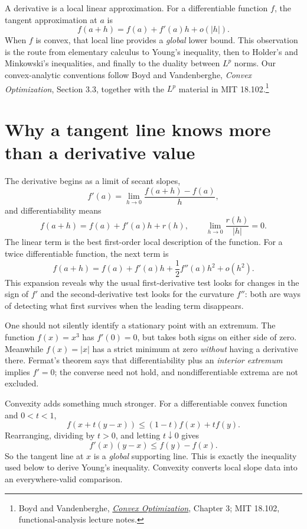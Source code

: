 
A derivative is a local linear approximation. For a differentiable function \(f\), the tangent approximation at \(a\) is
\[
 f(a+h)=f(a)+f'(a)h+o(|h|).
\]
When \(f\) is convex, that local line provides a \emph{global} lower bound. This observation is the route from elementary calculus to Young's inequality, then to Holder's and Minkowski's inequalities, and finally to the duality between \(L^p\) norms. Our convex-analytic conventions follow Boyd and Vandenberghe, \emph{Convex Optimization}, Section 3.3, together with the \(L^p\) material in MIT 18.102.\footnote{Boyd and Vandenberghe, \href{https://web.stanford.edu/~boyd/cvxbook/}{\emph{Convex Optimization}}, Chapter 3; MIT 18.102, functional-analysis lecture notes.}

\section{Why a tangent line knows more than a derivative value}

The derivative begins as a limit of secant slopes,
\[
 f'(a)=\lim_{h\to0}\frac{f(a+h)-f(a)}h,
\]
and differentiability means
\[
 f(a+h)=f(a)+f'(a)h+r(h),\qquad
 \lim_{h\to0}\frac{r(h)}{|h|}=0.
\]
The linear term is the best first-order local description of the function. For a twice differentiable function, the next term is
\[
 f(a+h)=f(a)+f'(a)h+\frac12f''(a)h^2+o(h^2).
\]
This expansion reveals why the usual first-derivative test looks for changes in the sign of $f'$ and the second-derivative test looks for the curvature $f''$: both are ways of detecting what first survives when the leading term disappears.

One should not silently identify a stationary point with an extremum. The function $f(x)=x^3$ has $f'(0)=0$, but takes both signs on either side of zero. Meanwhile $f(x)=|x|$ has a strict minimum at zero \emph{without} having a derivative there. Fermat's theorem says that differentiability plus an \emph{interior extremum} implies $f'=0$; the converse need not hold, and nondifferentiable extrema are not excluded.

Convexity adds something much stronger. For a differentiable convex function and $0<t<1$,
\[
 f(x+t(y-x))\le(1-t)f(x)+tf(y).
\]
Rearranging, dividing by $t>0$, and letting $t\downarrow0$ gives
\[
 f'(x)(y-x)\le f(y)-f(x).
\]
So the tangent line at $x$ is a \emph{global} supporting line. This is exactly the inequality used below to derive Young's inequality. Convexity converts local slope data into an everywhere-valid comparison.

